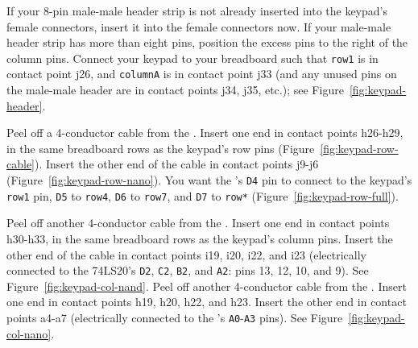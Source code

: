 If your 8-pin male-male header strip is not already inserted into the keypad's
female connectors, insert it into the female connectors now. If your male-male
header strip has more than eight pins, position the excess pins to the right of
the column pins. Connect your keypad to your breadboard such that \texttt{row1}
is in contact point j26, and \texttt{columnA} is in contact point j33 (and any
unused pins on the male-male header are in contact points j34, j35, etc.); see
Figure~\ref{fig:keypad-header}.

Peel off a 4-conductor cable from the \rainbow. Insert one end in contact
points h26-h29, in the same breadboard rows as the keypad's row pins
(Figure~\ref{fig:keypad-row-cable}). Insert the other end of the cable in
contact points j9-j6 (Figure~\ref{fig:keypad-row-nano}). You want the \nano's
\texttt{D4} pin to connect to the keypad's \texttt{row1} pin, \texttt{D5} to
\texttt{row4}, \texttt{D6} to \texttt{row7}, and \texttt{D7} to \texttt{row*}
(Figure~\ref{fig:keypad-row-full}).

Peel off another 4-conductor cable from the \rainbow. Insert one end in contact
points h30-h33, in the same breadboard rows as the keypad's column pins. Insert
the other end of the cable in contact points i19, i20, i22, and i23
(electrically connected to the 74LS20's \texttt{D2}, \texttt{C2}, \texttt{B2},
and \texttt{A2}: pins 13, 12, 10, and 9). See
Figure~\ref{fig:keypad-col-nand}. Peel off another 4-conductor cable from
the \rainbow. Insert one end in contact points h19, h20, h22, and h23. Insert
the other end in contact points a4-a7 (electrically connected to the \nano's
\texttt{A0}-\texttt{A3} pins). See Figure~\ref{fig:keypad-col-nano}.

